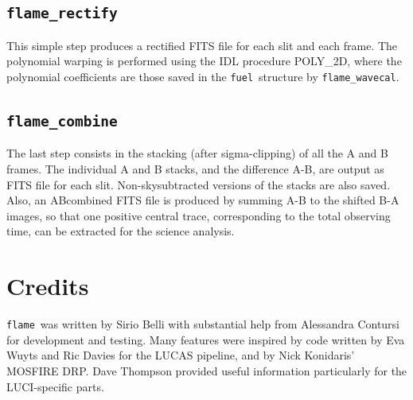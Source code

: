 \documentclass[a4paper, notitlepage]{article}
\newcommand{\flame}{\texttt{flame}}
\newcommand{\fuel}{\texttt{fuel}}
\begin{document}
\subsection{\texttt{flame\_rectify}}

This simple step produces a rectified FITS file for each slit and each frame. The polynomial warping is performed using the IDL procedure POLY\_2D, where the polynomial coefficients are those saved in the \fuel\ structure by \texttt{flame\_wavecal}.



\subsection{\texttt{flame\_combine}}

The last step consists in the stacking (after sigma-clipping) of all the A and B frames. The individual A and B stacks, and the difference A-B, are output as FITS file for each slit. Non-skysubtracted versions of the stacks are also saved. Also, an ABcombined FITS file is produced by summing A-B to the shifted B-A images, so that one positive central trace, corresponding to the total observing time, can be extracted for the science analysis.




\vspace{10mm}

\section*{Credits}

\flame\ was written by Sirio Belli with substantial help from Alessandra Contursi for development and testing. Many features were inspired by code written by Eva Wuyts and Ric Davies for the LUCAS pipeline, and by Nick Konidaris' MOSFIRE DRP. Dave Thompson provided useful information particularly for the LUCI-specific parts.
\end{document}
